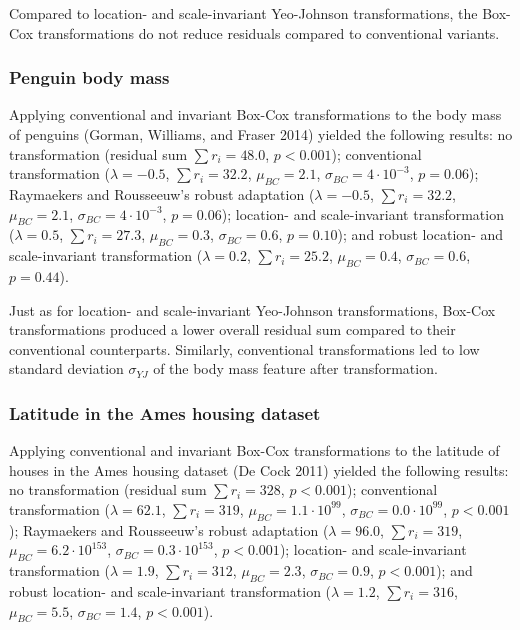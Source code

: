 \documentclass[
  a4paper,
]{article}
\begin{document}
Compared to location- and scale-invariant Yeo-Johnson transformations,
the Box-Cox transformations do not reduce residuals compared to
conventional variants.

\subsubsection{Penguin body mass}\label{penguin-body-mass}

Applying conventional and invariant Box-Cox transformations to the body
mass of penguins (Gorman, Williams, and Fraser 2014) yielded the
following results: no transformation (residual sum \(\sum r_i = 48.0\),
\(p < 0.001\)); conventional transformation (\(\lambda = -0.5\),
\(\sum r_i = 32.2\), \(\mu_{BC} = 2.1\),
\(\sigma_{BC} = 4 \cdot 10^{-3}\), \(p = 0.06\)); Raymaekers and
Rousseeuw's robust adaptation (\(\lambda = -0.5\), \(\sum r_i = 32.2\),
\(\mu_{BC} = 2.1\), \(\sigma_{BC} = 4 \cdot 10^{-3}\), \(p = 0.06\));
location- and scale-invariant transformation (\(\lambda = 0.5\),
\(\sum r_i = 27.3\), \(\mu_{BC} = 0.3\), \(\sigma_{BC} = 0.6\),
\(p = 0.10\)); and robust location- and scale-invariant transformation
(\(\lambda = 0.2\), \(\sum r_i = 25.2\), \(\mu_{BC} = 0.4\),
\(\sigma_{BC} = 0.6\), \(p = 0.44\)).

Just as for location- and scale-invariant Yeo-Johnson transformations,
Box-Cox transformations produced a lower overall residual sum compared
to their conventional counterparts. Similarly, conventional
transformations led to low standard deviation \(\sigma_{YJ}\) of the
body mass feature after transformation.

\subsubsection{Latitude in the Ames housing
dataset}\label{latitude-in-the-ames-housing-dataset}

Applying conventional and invariant Box-Cox transformations to the
latitude of houses in the Ames housing dataset (De Cock 2011) yielded
the following results: no transformation (residual sum
\(\sum r_i = 328\), \(p < 0.001\)); conventional transformation
(\(\lambda = 62.1\), \(\sum r_i = 319\),
\(\mu_{BC} = 1.1 \cdot 10^{99}\), \(\sigma_{BC} = 0.0 \cdot 10^{99}\),
\(p < 0.001\)); Raymaekers and Rousseeuw's robust adaptation
(\(\lambda = 96.0\), \(\sum r_i = 319\),
\(\mu_{BC} = 6.2 \cdot 10^{153}\), \(\sigma_{BC} = 0.3 \cdot 10^{153}\),
\(p < 0.001\)); location- and scale-invariant transformation
(\(\lambda = 1.9\), \(\sum r_i = 312\), \(\mu_{BC} = 2.3\),
\(\sigma_{BC} = 0.9\), \(p < 0.001\)); and robust location- and
scale-invariant transformation (\(\lambda = 1.2\), \(\sum r_i = 316\),
\(\mu_{BC} = 5.5\), \(\sigma_{BC} = 1.4\), \(p < 0.001\)).
\end{document}
